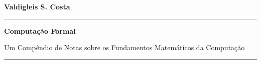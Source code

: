\begingroup
    \thispagestyle{empty}
    \begin{center}
        {\LARGE \textbf{Valdigleis S. Costa}}\par %
        \vspace*{1cm}
        \hrule
        \vspace*{1cm}
        {\normalfont\fontsize{35}{35}\sffamily\selectfont
        \textbf{Computação Formal}}\par
    	\vspace*{0.2cm}
        {Um Compêndio de Notas sobre os Fundamentos Matemáticos da Computação}
        \vspace*{1cm}
        \hrule
        \vspace*{1cm}
    \end{center}
    
    \vspace*{5cm}
\endgroup